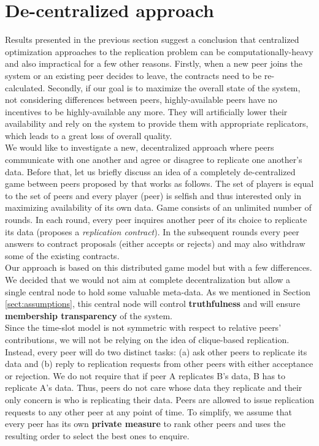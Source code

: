 \documentclass{pracamgren}
\begin{document}
\section{De-centralized approach}\label{sect:decentralized}

Results presented in the previous section suggest a conclusion that centralized optimization approaches to the replication problem can be computationally-heavy and also impractical for a few other reasons. Firstly, when a new peer joins the system or an existing peer decides to leave, the contracts need to be re-calculated. Secondly, if our goal is to maximize the overall state of the system, not considering differences between peers, highly-available peers have no incentives to be highly-available any more. They will artificially lower their availability and rely on the system to provide them with appropriate replicators, which leads to a great loss of overall quality.\\

We would like to investigate a new, decentralized approach where peers communicate with one another and agree or disagree to replicate one another's data. Before that, let us briefly discuss an idea of a completely de-centralized game between peers proposed by \cite{krz} that works as follows. The set of players is equal to the set of peers and every player (peer) is selfish and thus interested only in maximizing availability of its own data. Game consists of an unlimited number of rounds. In each round, every peer inquires another peer of its choice to replicate its data (proposes a {\it replication contract}). In the subsequent rounds every peer answers to contract proposals (either accepts or rejects) and may also withdraw some of the existing contracts.\\

Our approach is based on this distributed game model but with a few differences. We decided that we would not aim at complete decentralization but allow a single central node to hold some valuable meta-data. As we mentioned in Section \ref{sect:assumptions}, this central node will control {\bf truthfulness} and will ensure {\bf membership transparency} of the system.\\

Since the time-slot model is not symmetric with respect to relative peers' contributions, we will not be relying on the idea of clique-based replication. Instead, every peer will do two distinct tasks: (a) ask other peers to replicate its data and (b) reply to replication requests from other peers with either acceptance or rejection. We do not require that if peer A replicates B's data, B has to replicate A's data. Thus, peers do not care whose data they replicate and their only concern is who is replicating their data. Peers are allowed to issue replication requests to any other peer at any point of time. To simplify, we assume that every peer has its own {\bf private measure} to rank other peers and uses the resulting order to select the best ones to enquire.\\
\end{document}
